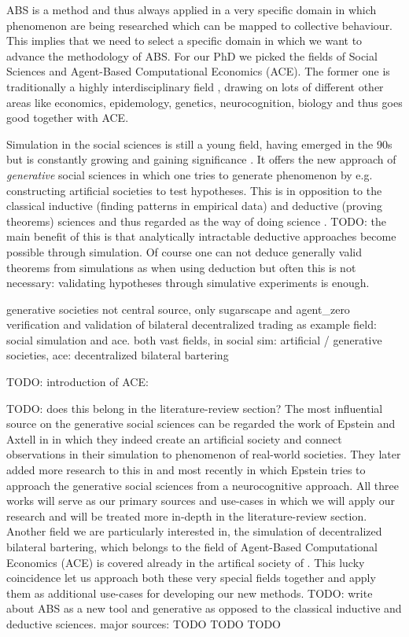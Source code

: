 ABS is a method and thus always applied in a very specific domain in which phenomenon are being researched which can be mapped to collective behaviour. This implies that we need to select a specific domain in which we want to advance the methodology of ABS. For our PhD we picked the fields of Social Sciences and Agent-Based Computational Economics (ACE). The former one is traditionally a highly interdisciplinary field \cite{axelrod_chapter_2006}, drawing on lots of different other areas like economics, epidemology, genetics, neurocognition, biology and thus goes good together with ACE. 

Simulation in the social sciences is still a young field, having emerged in the 90s but is constantly growing and gaining significance \cite{axelrod_advancing_1997}. It offers the new approach of \textit{generative} social sciences in which one tries to generate phenomenon by e.g. constructing artificial societies to test hypotheses. This is in opposition to the classical inductive (finding patterns in empirical data) and deductive (proving theorems) sciences and thus regarded as the way of doing science \cite{axelrod_advancing_1997}. 
TODO: the main benefit of this is that analytically intractable deductive approaches become possible through simulation. Of course one can not deduce generally valid theorems from simulations as when using deduction but often this is not necessary: validating hypotheses through simulative experiments is enough.

generative societies not central source, only sugarscape and agent\_zero
verification and validation of bilateral decentralized trading as example
field: social simulation and ace. both vast fields, in social sim: artificial / generative societies, ace: decentralized bilateral bartering

TODO: introduction of ACE: \cite{tesfatsion_agent-based_2006}

TODO: does this belong in the literature-review section?
The most influential source on the generative social sciences can be regarded the work of Epstein and Axtell in \cite{epstein_growing_1996} in which they indeed create an artificial society and connect observations in their simulation to phenomenon of real-world societies. They later added more research to this in \cite{epstein_generative_2012} and most recently \cite{epstein_agent_zero:_2014} in which Epstein tries to approach the generative social sciences from a neurocognitive approach. All three works will serve as our primary sources and use-cases in which we will apply our research and will be treated more in-depth in the literature-review section. Another field we are particularly interested in, the simulation of decentralized bilateral bartering, which belongs to the field of Agent-Based Computational Economics (ACE) \cite{tesfatsion_agent-based_2006} is covered already in the artifical society of \cite{epstein_growing_1996}. This lucky coincidence let us approach both these very special fields together and apply them as additional use-cases for developing our new methods. 
TODO: write about ABS as a new tool and  generative as opposed to the classical inductive and deductive sciences. major sources: 
TODO \cite{axtell_aligning_1996}
TODO \cite{epstein_chapter_2006}
TODO \cite{epstein_generative_2012}

